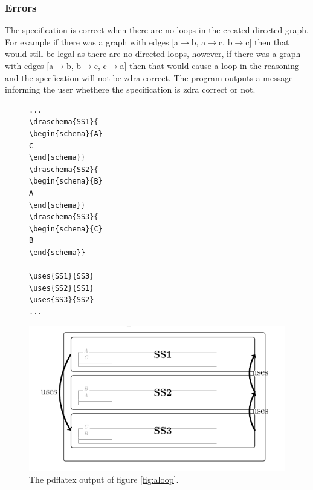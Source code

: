 \subsubsection{Errors}
\label{subsubsec:zdra_looperrors}


The specification is correct when there are no loops in the created directed graph. For example if there was a graph with edges [a$\rightarrow$b, a$\rightarrow$c, b$\rightarrow$c] then that would still be legal as there are no directed loops, however, if there was a graph with edges [a$\rightarrow$b, b$\rightarrow$c, c$\rightarrow$a] then that would cause a loop in the reasoning and the specfication will not be \gls{zdra} correct. The program outputs a message informing the user whethere the specification is \gls{zdra} correct or not.

\begin{figure}[H]
\vspace{-0.2in}
\centering
\begin{minipage}{0.45\textwidth}
\centering
\begin{scriptsize}
\begin{BVerbatim}
...
\draschema{SS1}{
\begin{schema}{A}
C
\end{schema}}
\draschema{SS2}{
\begin{schema}{B}
A
\end{schema}}
\draschema{SS3}{
\begin{schema}{C}
B
\end{schema}}

\uses{SS1}{SS3}
\uses{SS2}{SS1}
\uses{SS3}{SS2}
...
\end{BVerbatim}
\end{scriptsize}
\vspace{-0.18in}
\caption{An example of a loop in the reasoning in a labelled ZDRa specification.\label{fig:aloop}}
\vspace{-0.2in}
\end{minipage}\hfill
\begin{minipage}{0.45\textwidth}
\centering
\includegraphics[scale=0.33]{Figures/zdra/zdraloop.png}
\vspace{-0.18in}
\caption{The pdflatex output of figure \ref{fig:aloop}.  \label{fig:zdraerror1}}
\vspace{-0.2in}
\end{minipage}
\end{figure}

